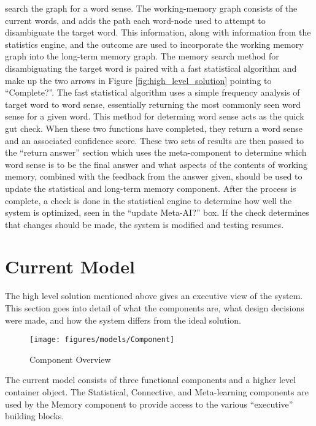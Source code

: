 search the graph for a word sense.  The working-memory graph consists of the current words, and 
adds the path each word-node used to attempt to disambiguate the target word. This information, 
along with information from the statistics engine, and the outcome are used to incorporate the 
working memory graph into the long-term memory graph.
The memory search method for disambiguating the target word is paired with a fast statistical 
algorithm and make up the two arrows in Figure \ref{fig:high_level_solution} pointing to 
``Complete?''. The fast statistical algorithm uses a simple frequency analysis of target word  
to word sense, essentially returning the most commonly seen word sense for a given word.
This method for determing word sense acts as the quick gut check. When these two   
functions have completed, they return a word sense and an associated confidence score.
These two sets of results are then passed to the ``return answer'' section which uses the
meta-component to determine which word sense is to be the final answer and what aspects of the 
contents of working memory, combined with the feedback from the answer given, should be used to 
update the statistical and long-term memory component. After the 
process is complete, a check is done in the statistical engine to determine how well the 
system is optimized, seen in the ``update Meta-AI?'' box.  If the check determines that changes should 
be made, the system is modified and testing resumes.

\section{Current Model}

The high level solution mentioned above gives an executive view of the system.
This section goes into detail of what the components are, what design decisions
were made, and how the system differs from the ideal solution.

\begin{figure}[htp]     
	\begin{center}
		\texttt{[image: figures/models/Component]}
		\caption{Component Overview
			\label{fig:Component}}     
	\end{center}     
\end{figure}

The current model consists of three functional components and a higher level
container object.  The Statistical,
Connective, and Meta-learning components are used by the Memory component to
provide access to the various ``executive'' building blocks.

